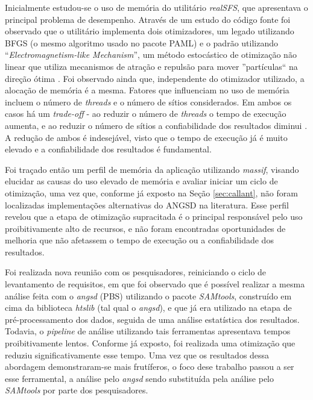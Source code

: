 \documentclass[cic,tc]{iiufrgs}
\begin{document}
Inicialmente estudou-se o uso de memória do utilitário \textit{realSFS}, que apresentava o
principal problema de desempenho. Através de um estudo do código fonte foi
observado que o utilitário implementa dois otimizadores, um legado utilizando
BFGS (o mesmo algoritmo usado no pacote PAML) e o padrão utilizando
``\textit{Electromagnetism-like Mechanism}'', um método estocástico de otimização
não linear que utiliza mecanismos de atração e repulsão para mover
''partículas`` na direção ótima \cite{5636954}. Foi observado ainda que,
independente do otimizador utilizado, a alocação de memória é a mesma. Fatores
que influenciam no uso de memória incluem o número de \textit{threads} e o número de
sítios considerados. Em ambos os casos há um \textit{trade-off} - ao reduzir o
número de \textit{threads} o tempo de execução aumenta, e ao reduzir o número de sítios
a confiabilidade dos resultados diminui \cite{popgen2016angsd}. A redução de
ambos é indesejável, visto que o tempo de execução já é muito elevado e a
confiabilidade dos resultados é fundamental.

Foi traçado então um perfil de memória da aplicação utilizando \textit{massif}, visando
elucidar as causas do uso elevado de memória e avaliar iniciar um ciclo de
otimização, uma vez que, conforme já exposto na Seção \ref{sec:callant}, não
foram localizadas implementações alternativas do ANGSD na literatura. Esse
perfil revelou que a etapa de otimização supracitada é o principal responsável
pelo uso proibitivamente alto de recursos, e não foram encontradas
oportunidades de melhoria que não afetassem o tempo de execução ou a
confiabilidade dos resultados.

Foi realizada nova reunião com os pesquisadores, reiniciando o ciclo de
levantamento de requisitos, em que foi observado que é possível realizar a mesma
análise feita com o \textit{angsd} (PBS) utilizando o pacote \textit{SAMtools}, construído em
cima da biblioteca \textit{htslib} (tal qual o \textit{angsd}), e que já era utilizado na etapa
de pré-processamento dos dados, seguida de uma análise estatística dos
resultados. Todavia, o \textit{pipeline} de análise utilizando tais ferramentas
apresentava tempos proibitivamente lentos. Conforme já exposto, foi realizada
uma otimização que reduziu significativamente esse tempo. Uma vez que os
resultados dessa abordagem demonstraram-se mais frutíferos, o foco dese
trabalho passou a ser esse ferramental, a análise pelo \textit{angsd} sendo substituída
pela análise pelo \textit{SAMtools} por parte dos pesquisadores.
\end{document}
